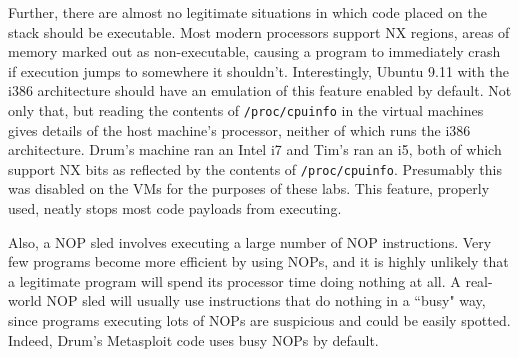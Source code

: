 Further, there are almost no legitimate situations in which code placed on the stack should be executable. Most modern
processors support NX regions, areas of memory marked out as non-executable, causing a program to immediately crash if
execution jumps to somewhere it shouldn't. Interestingly, Ubuntu 9.11 with the i386 architecture should have an
emulation of this feature enabled by default. %
Not only that, but reading the contents of {\tt /proc/cpuinfo} in the virtual machines gives details of the host
machine's processor, neither of which runs the i386 architecture. Drum's machine ran an Intel i7 and Tim's ran an i5,
both of which support NX bits as reflected by the contents of {\tt /proc/cpuinfo}.
Presumably this was disabled on the VMs for the purposes of these labs. This feature, properly used, neatly stops most
code payloads from executing.

Also, a NOP sled involves executing a large number of NOP instructions. Very few programs become more efficient by using
NOPs,%
and it is highly unlikely that a legitimate program will spend its processor time doing nothing at all. A real-world NOP
sled will usually use instructions that do nothing in a ``busy" way, %
since programs executing lots of NOPs are suspicious and could be easily spotted. Indeed, Drum's Metasploit code uses
busy NOPs by default.


